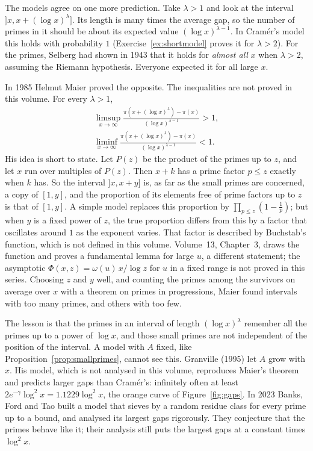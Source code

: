 The models agree on one more prediction. Take $\lambda>1$ and look at the interval $]x,x+(\log x)^\lambda]$. Its length is many times the average gap, so the number of primes in it should be about its
expected value $(\log x)^{\lambda-1}$. In Cramér's model this holds with probability $1$ (Exercise~\ref{ex:shortmodel} proves it for $\lambda>2$). For the primes, Selberg had shown in 1943 that it holds for
\emph{almost all} $x$ when $\lambda>2$, assuming the Riemann hypothesis. Everyone expected it for all large $x$.

\begin{remark}
In 1985 Helmut Maier proved the opposite. The inequalities are not proved in this volume. For every $\lambda>1$,
\[
\begin{gathered}\limsup_{x\to\infty}\frac{\pi(x+(\log x)^\lambda)-\pi(x)}{(\log x)^{\lambda-1}}>1,\\\liminf_{x\to\infty}\frac{\pi(x+(\log x)^\lambda)-\pi(x)}{(\log x)^{\lambda-1}}<1.\end{gathered}
\]
His idea is short to state. Let $P(z)$ be the product of the primes up to $z$, and let $x$ run over multiples of $P(z)$. Then $x+k$ has a prime factor $p\le z$ exactly when $k$ has. So the interval
$]x,x+y]$ is, as far as the small primes are concerned, a copy of $[1,y]$, and the proportion of its elements free of prime factors up to $z$ is that of $[1,y]$. A simple model replaces this proportion by
$\prod_{p\le z}(1-\frac1p)$; but when $y$ is a fixed power of $z$, the true proportion differs from this by a factor that oscillates around $1$ as the exponent varies. That factor is described by Buchstab's function, which is not defined in this volume. Volume~13, Chapter~3, draws the function and proves a fundamental lemma for large $u$, a different statement; the asymptotic $\Phi(x,z)=\omega(u)\,x/\log z$ for $u$ in a fixed range is not proved in this series.
Choosing $z$ and $y$ well, and counting the primes among the survivors on average over $x$ with a theorem on primes in progressions, Maier found intervals with too many primes, and others with too few.
\end{remark}

The lesson is that the primes in an interval of length $(\log x)^\lambda$ remember all the primes up to a power of $\log x$, and those small primes are not independent of the position of the interval. A model with $A$ fixed, like
Proposition~\ref{prop:smallprimes}, cannot see this. Granville (1995) let $A$ grow with $x$. His model, which is not analysed in this volume, reproduces Maier's theorem and predicts larger gaps than Cramér's: infinitely often at least
$2e^{-\gamma}\log^2x=1.1229\log^2x$, the orange curve of Figure~\ref{fig:gaps}. In 2023 Banks, Ford and Tao built a model that sieves by a random residue class for every prime up to a bound, and analysed its largest gaps rigorously.
They conjecture that the primes behave like it; their analysis still puts the largest gaps at a constant times $\log^2x$.

